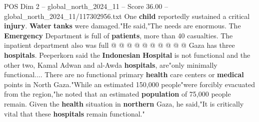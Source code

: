 \begin{textsample}{POS Dim 2 – global\_north\_2024\_11 – Score 36.00 – global\_north\_2024\_11/117302956.txt}
One \textbf{child} reportedly sustained a critical \textbf{injury}. \textbf{Water} \textbf{tanks} were damaged."He said,"The needs are enormous.
The \textbf{Emergency} Department is full of \textbf{patients}, more than 40 casualties.
The inpatient department also was full @ @ @ @ @ @ @ @ @ @ Gaza has three \textbf{hospitals}.
Peeperkorn said the \textbf{Indonesian} \textbf{Hospital} is not functional and the other two, Kamal Adwan and al-Awda \textbf{hospitals}, are"only minimally functional....
There are no functional primary \textbf{health} care centers or \textbf{medical} points in North Gaza."While an estimated 150,000 people"were forcibly evacuated from the region,"he noted that an estimated \textbf{population} of 75,000 people remain.
Given the \textbf{health} situation in \textbf{northern} Gaza, he said,"It is critically vital that these \textbf{hospitals} remain functional."

\end{textsample}
